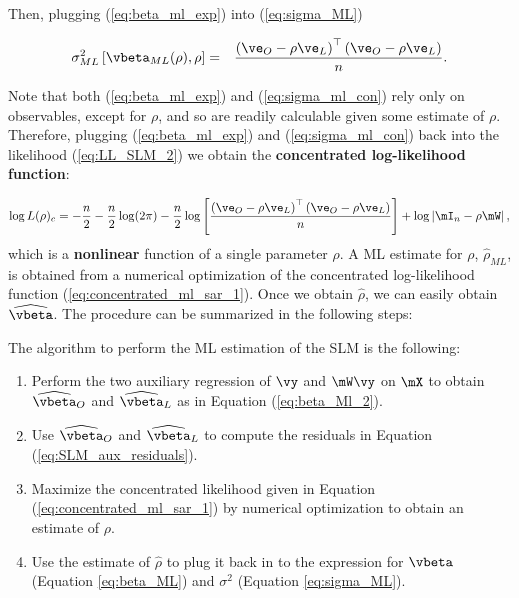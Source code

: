 \documentclass[english,12pt]{book}\usepackage[]{graphicx}\usepackage[]{xcolor}
\begin{document}
Then, plugging (\ref{eq:beta_ml_exp}) into (\ref{eq:sigma_ML})

\begin{eqnarray}\label{eq:sigma_ml_con}
\sigma^2_{ML}\left[\vbeta_{ML}(\rho) , \rho\right] &=& \frac{\left(\ve_O - \rho\ve_L\right)^\top\left(\ve_O - \rho\ve_L\right)}{n}.
\end{eqnarray}

Note that both (\ref{eq:beta_ml_exp}) and (\ref{eq:sigma_ml_con}) rely only on observables, except for $\rho$, and so are readily calculable given some estimate of $\rho$. Therefore, plugging (\ref{eq:beta_ml_exp}) and (\ref{eq:sigma_ml_con}) back into the likelihood (\ref{eq:LL_SLM_2})  we obtain the \textbf{concentrated log-likelihood function}:

\begin{equation}\label{eq:concentrated_ml_sar_1}
\log L(\rho)_c=-\frac{n}{2}-\frac{n}{2}\log(2\pi) - \frac{n}{2}\log\left[\frac{\left(\ve_O - \rho\ve_L\right)^\top\left(\ve_O - \rho\ve_L\right)}{n}\right] + \log\left|\mI_n - \rho\mW\right|,
\end{equation}	
%	
which is a \textbf{nonlinear} function of a single parameter $\rho$. A ML estimate for $\rho$, $\widehat{\rho}_{ML}$, is obtained from a numerical optimization of the concentrated log-likelihood function (\ref{eq:concentrated_ml_sar_1}). Once we obtain $\widehat{\rho}$, we can easily obtain $\widehat{\vbeta}$.  The procedure can be summarized in the following steps:

\begin{algorithm}\label{algorithm:SLM}
The algorithm to perform the ML estimation of the SLM is the following: 
\begin{enumerate}
	\item Perform the two auxiliary regression of $\vy$ and $\mW\vy$ on $\mX$ to obtain $\widehat{\vbeta}_O$ and $\widehat{\vbeta}_L$ as in Equation (\ref{eq:beta_Ml_2}).
	\item Use $\widehat{\vbeta}_O$ and $\widehat{\vbeta}_L$ to compute the residuals in Equation (\ref{eq:SLM_aux_residuals}). 
	\item Maximize the concentrated likelihood given in Equation (\ref{eq:concentrated_ml_sar_1}) by numerical optimization to obtain an estimate of $\rho$.
	\item Use the estimate of $\widehat{\rho}$ to plug it back in to the expression for $\vbeta$ (Equation \ref{eq:beta_ML}) and $\sigma^2$	 (Equation \ref{eq:sigma_ML}).
\end{enumerate}	
\end{algorithm}
\end{document}
